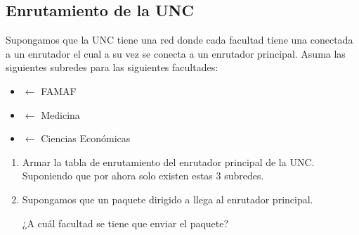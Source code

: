 \documentclass[12pt]{report}
\begin{document}
\begin{exer}
	\subsection{Enrutamiento de la UNC \sfour}
	Supongamos que la UNC tiene una red donde cada facultad tiene una  conectada a un enrutador el cual a su vez se conecta a un enrutador principal. Asuma las siguientes subredes para las siguientes facultades:

	\begin{itemize}
		\item {} $\leftarrow$ FAMAF
		\item {} $\leftarrow$ Medicina
		\item {} $\leftarrow$ Ciencias Económicas
	\end{itemize}

	\begin{enumerate}
		\item Armar la tabla de enrutamiento del enrutador principal de la UNC. Suponiendo que
		      por ahora solo existen estas 3 subredes.
		\item Supongamos que un paquete dirigido a  llega al enrutador principal.

		      ¿A cuál facultad se tiene que enviar el paquete?
	\end{enumerate}
\end{exer}
\end{document}
